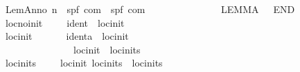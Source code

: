 \begin{isabellebody}
\ \ {\isachardoublequoteopen}{\isacharunderscore}LemAnno{\isachardoublequoteclose}{\isacharcolon}{\isacharcolon}\ {\isachardoublequoteopen}{\isacharprime}n\ {\isasymRightarrow}\ {\isacharparenleft}{\isacharprime}s{\isacharcomma}{\isacharprime}p{\isacharcomma}{\isacharprime}f{\isacharparenright}\ com\ {\isasymRightarrow}\ {\isacharparenleft}{\isacharprime}s{\isacharcomma}{\isacharprime}p{\isacharcomma}{\isacharprime}f{\isacharparenright}\ com{\isachardoublequoteclose}\isanewline
\ \ \ \ \ \ \ \ \ \ \ \ \ \ {\isacharparenleft}{\isachardoublequoteopen}{\isacharparenleft}{}\ LEMMA\ {\isacharparenleft}{\isacharunderscore}{\isacharparenright}{\isacharslash}\ {\isacharunderscore}\ END{\isacharparenright}{\isachardoublequoteclose}\ {\isacharbrackleft}{}{}{}{}{\isacharcomma}{}{\isacharbrackright}\ {}{}{\isacharparenright}\isanewline
\ \ {\isachardoublequoteopen}{\isacharunderscore}locnoinit{\isachardoublequoteclose}\ \ \ \ {\isacharcolon}{\isacharcolon}\ {\isachardoublequoteopen}ident\ {\isasymRightarrow}\ locinit{\isachardoublequoteclose}\ \ \ \ \ \ \ \ \ \ \ \ \ \ \ {\isacharparenleft}{\isachardoublequoteopen}{\isasymacute}{\isacharunderscore}{\isachardoublequoteclose}{\isacharparenright}\isanewline
\ \ {\isachardoublequoteopen}{\isacharunderscore}locinit{\isachardoublequoteclose}\ \ \ \ \ \ {\isacharcolon}{\isacharcolon}\ {\isachardoublequoteopen}{\isacharbrackleft}ident{\isacharcomma}{\isacharprime}a{\isacharbrackright}\ {\isasymRightarrow}\ locinit{\isachardoublequoteclose}\ \ \ \ \ \ \ \ \ \ {\isacharparenleft}{\isachardoublequoteopen}{\isacharparenleft}{}{\isasymacute}{\isacharunderscore}\ {\isacharcolon}{\isacharequal}{\isacharequal}{\isacharslash}\ {\isacharunderscore}{\isacharparenright}{\isachardoublequoteclose}{\isacharparenright}\isanewline
\ \ {\isachardoublequoteopen}{\isachardoublequoteclose}\ \ \ \ \ \ \ \ \ \ \ \ \ {\isacharcolon}{\isacharcolon}\ {\isachardoublequoteopen}locinit\ {\isasymRightarrow}\ locinits{\isachardoublequoteclose}\ \ \ \ \ \ \ \ \ \ \ \ \ {\isacharparenleft}{\isachardoublequoteopen}{\isacharunderscore}{\isachardoublequoteclose}{\isacharparenright}\isanewline
\ \ {\isachardoublequoteopen}{\isacharunderscore}locinits{\isachardoublequoteclose}\ \ \ \ {\isacharcolon}{\isacharcolon}\ {\isachardoublequoteopen}{\isacharbrackleft}locinit{\isacharcomma}\ locinits{\isacharbrackright}\ {\isasymRightarrow}\ locinits{\isachardoublequoteclose}\ {\isacharparenleft}{\isachardoublequoteopen}{\isacharunderscore}{\isacharcomma}{\isacharslash}\ {\isacharunderscore}{\isachardoublequoteclose}{\isacharparenright}\isanewline

\end{isabellebody}
